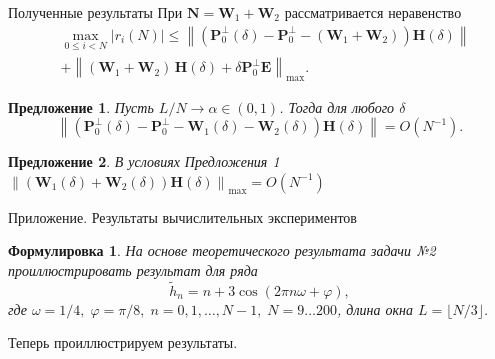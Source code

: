 \documentclass[notheorems, handout]{beamer}
\newtheorem{sentence}{Предложение}
\newtheorem{formulation}{Формулировка}
\newcommand{\norm}[1]{\left\|#1\right\|}
\begin{document}
	\begin{frame}{Полученные результаты}
		При $\mathbf{N}=\mathbf{W}_1 + \mathbf{W}_2$ рассматривается неравенство
		\begin{align*}
			&\max_{0\leqslant i<N} |r_i(N)|\leqslant \norm{(\mathbf{P}_0^\bot(\delta)- \mathbf{P}_0^\bot-(\mathbf{W}_1+\mathbf{W}_2))\mathbf{H}(\delta)}
			\\
			&+\norm{ (\mathbf{W}_1+\mathbf{W}_2)\, \mathbf{H}(\delta) + \delta \mathbf{P}_0^\perp \mathbf{E}}_{\max}.
		\end{align*}
		\begin{sentence}
			Пусть $L/N\rightarrow\alpha\in(0,1)$. Тогда для любого $\delta$
			\begin{equation*}
				\norm{\left(\mathbf{P}_0^\bot(\delta) - \mathbf{P}_0^\bot - \mathbf{W}_1(\delta) - \mathbf{W}_2(\delta)\right)\mathbf{H}(\delta)} = O(N^{-1}).
			\end{equation*}
		\end{sentence}
		\begin{sentence}
			В условиях Предложения 1 $\norm{(\mathbf{W}_1(\delta)+\mathbf{W}_2(\delta))\mathbf{H}(\delta)}_{\max}=O(N^{-1})$
		\end{sentence}
	\end{frame}
%		
	\begin{frame}{Приложение. Результаты вычислительных экспериментов}
		\begin{formulation}
				\textit{На основе теоретического результата задачи №2 проиллюстрировать результат для ряда
				\begin{equation*}
					\widetilde{h}_n = n + 3\cos(2\pi n\omega + \varphi),
				\end{equation*}
				где $\omega = 1/4,\;\varphi = \pi/8,\;n=0,1,\dots,N-1,\;N=9\dots200$, длина окна $L=\lfloor N/3\rfloor$.}
		\end{formulation}
		Теперь проиллюстрируем результаты.
	\end{frame}
\end{document}
